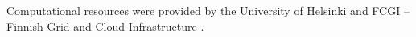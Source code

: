 \documentclass[english,twoside,openright]{HYgradu}
\begin{document}





















Computational resources were provided by the University of Helsinki and FCGI -- Finnish Grid and Cloud Infrastructure \cite{finnishGridAndCloud}.


\cleardoublepage %


\renewcommand{\bibname}{References}


\end{document}
